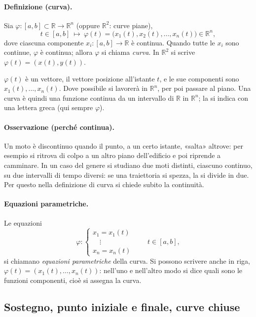 \paragraph{Definizione (curva).} Sia $\varphi\colon[a,b]\subset\mathbb{R}\to\mathbb{R}^n$
(oppure $\mathbb{R}^2$: curve piane),
\[
t\in[a,b]\ \longmapsto\ \varphi(t)=\bigl(x_1(t),x_2(t),\dots,x_n(t)\bigr)\in\mathbb{R}^n,
\]
dove ciascuna componente $x_i\colon[a,b]\to\mathbb{R}$ è continua. Quando tutte le $x_i$
sono continue, $\varphi$ è continua; allora $\varphi$ si chiama \emph{curva}. In
$\mathbb{R}^2$ si scrive $\varphi(t)=(x(t),y(t))$.

$\varphi(t)$ è un vettore, il vettore posizione all'istante $t$, e le sue componenti sono
$x_1(t),\dots,x_n(t)$. Dove possibile si lavorerà in $\mathbb{R}^n$, per poi passare al
piano.
Una curva è quindi una funzione continua da un intervallo di $\mathbb{R}$ in
$\mathbb{R}^n$; la si indica con una lettera greca (qui sempre $\varphi$).

\paragraph{Osservazione (perché continua).} Un moto è discontinuo quando il punto, a un
certo istante, «salta» altrove: per esempio si ritrova di colpo a un altro piano
dell'edificio e poi riprende a camminare. In un caso del genere si studiano due moti
distinti, ciascuno continuo, su due intervalli di tempo diversi: se una traiettoria si
spezza, la si divide in due.
Per questo nella definizione di curva si chiede subito la continuità.

\paragraph{Equazioni parametriche.} Le equazioni
\[
\varphi\colon\begin{cases}
x_1=x_1(t)\\
\quad\vdots\\
x_n=x_n(t)
\end{cases}
\qquad t\in[a,b],
\]
si chiamano \emph{equazioni parametriche} della curva. Si possono scrivere anche in riga,
$\varphi(t)=(x_1(t),\dots,x_n(t))$:
nell'uno e nell'altro modo si dice quali sono le funzioni componenti, cioè si assegna la
curva.

\subsection{Sostegno, punto iniziale e finale, curve chiuse}

